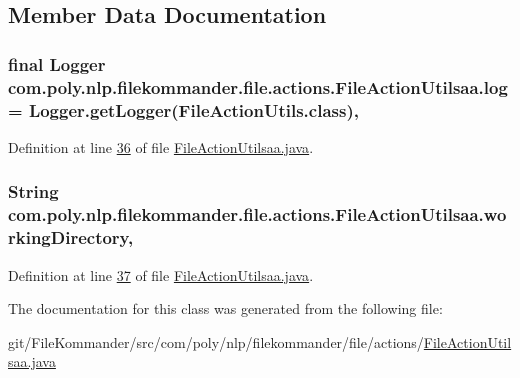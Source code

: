 \subsection{Member Data Documentation}
\hypertarget{classcom_1_1poly_1_1nlp_1_1filekommander_1_1file_1_1actions_1_1_file_action_utilsaa_a77b8f795458e1c7e9b013d6d06c6e97a}{
\subsubsection[{log}]{\setlength{\rightskip}{0pt plus 5cm}final Logger com.\-poly.\-nlp.\-filekommander.\-file.\-actions.\-File\-Action\-Utilsaa.\-log = Logger.\-get\-Logger(File\-Action\-Utils.\-class)\hspace{0.3cm}{\ttfamily [static]}, {\ttfamily [private]}}}\label{classcom_1_1poly_1_1nlp_1_1filekommander_1_1file_1_1actions_1_1_file_action_utilsaa_a77b8f795458e1c7e9b013d6d06c6e97a}


Definition at line \hyperlink{L36}{36} of file \hyperlink{}{File\-Action\-Utilsaa.\-java}.

\hypertarget{classcom_1_1poly_1_1nlp_1_1filekommander_1_1file_1_1actions_1_1_file_action_utilsaa_af9adb01342997356115f0a50f1ec2087}{
\subsubsection[{working\-Directory}]{\setlength{\rightskip}{0pt plus 5cm}String com.\-poly.\-nlp.\-filekommander.\-file.\-actions.\-File\-Action\-Utilsaa.\-working\-Directory\hspace{0.3cm}{\ttfamily [static]}, {\ttfamily [private]}}}\label{classcom_1_1poly_1_1nlp_1_1filekommander_1_1file_1_1actions_1_1_file_action_utilsaa_af9adb01342997356115f0a50f1ec2087}


Definition at line \hyperlink{L37}{37} of file \hyperlink{}{File\-Action\-Utilsaa.\-java}.



The documentation for this class was generated from the following file\-:\begin{DoxyCompactItemize}
\item 
git/\-File\-Kommander/src/com/poly/nlp/filekommander/file/actions/\hyperlink{_file_action_utilsaa_8java}{File\-Action\-Utilsaa.\-java}\end{DoxyCompactItemize}
